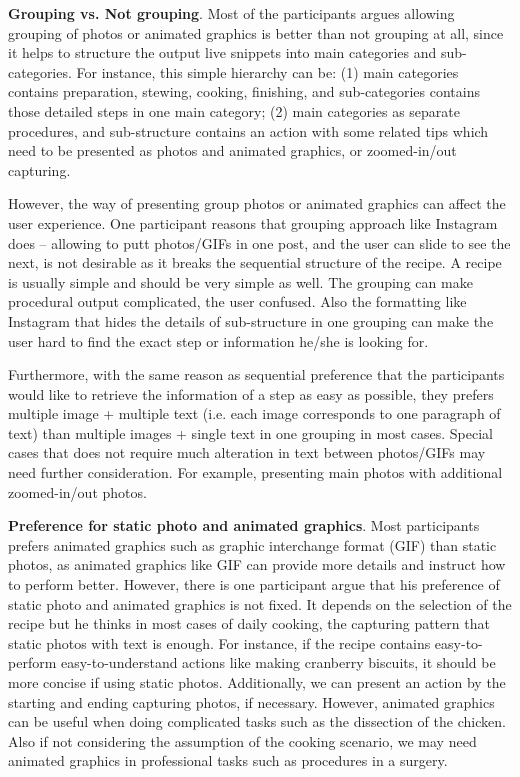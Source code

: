 \documentclass[fyp]{socreport}
\begin{document}
\textbf{Grouping vs. Not grouping}. Most of the participants argues allowing grouping of photos or animated graphics is better than not grouping at all, since it helps to structure the output live snippets into main categories and sub-categories. For instance, this simple hierarchy can be: (1) main categories contains preparation, stewing, cooking, finishing, and sub-categories contains those detailed steps in one main category; (2) main categories as separate procedures, and sub-structure contains an action with some related tips which need to be presented as photos and animated graphics, or zoomed-in/out capturing.

However, the way of presenting group photos or animated graphics can affect the user experience. One participant reasons that grouping approach like Instagram does -- allowing to putt photos/GIFs in one post, and the user can slide to see the next, is not desirable as it breaks the sequential structure of the recipe. A recipe is usually simple and should be very simple as well. The grouping can make procedural output complicated, the user confused. Also the formatting like Instagram that hides the details of sub-structure in one grouping can make the user hard to find the exact step or information he/she is looking for. 

Furthermore, with the same reason as sequential preference that the participants would like to retrieve the information of a step as easy as possible, they prefers multiple image + multiple text (i.e. each image corresponds to one paragraph of text) than multiple images + single text in one grouping in most cases. Special cases that does not require much alteration in text between photos/GIFs may need further consideration. For example, presenting main photos with additional zoomed-in/out photos.

\textbf{Preference for static photo and animated graphics}. Most participants prefers animated graphics such as graphic interchange format (GIF) than static photos, as animated graphics like GIF can provide more details and instruct how to perform better. However, there is one participant argue that his preference of static photo and animated graphics is not fixed. It depends on the selection of the recipe but he thinks in most cases of daily cooking, the capturing pattern that static photos with text is enough. For instance, if the recipe contains easy-to-perform easy-to-understand actions like making cranberry biscuits, it should be more concise if using static photos. Additionally, we can present an action by the starting and ending capturing photos, if necessary. However, animated graphics can be useful when doing complicated tasks such as the dissection of the chicken. Also if not considering the assumption of the cooking scenario, we may need animated graphics in professional tasks such as procedures in a surgery.
\end{document}

